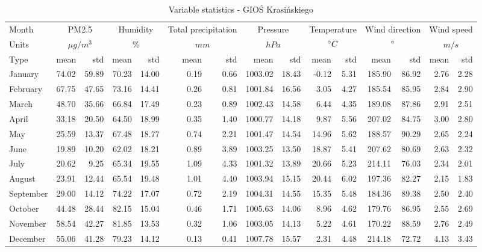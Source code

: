 \begin{landscape}
\begin{table}[H]
\centering
\caption{Variable statistics - GIOŚ Krasińskiego}
\label{tab:dataset-stats-krasinskiego}
\footnotesize
\begin{tabular}{llrrrrrrrrrrrrr}
\hline
Month & \multicolumn{2}{c}{PM2.5} & \multicolumn{2}{c}{Humidity} & \multicolumn{2}{c}{Total precipitation} & \multicolumn{2}{c}{Pressure} & \multicolumn{2}{c}{Temperature} & \multicolumn{2}{c}{Wind direction} & \multicolumn{2}{c}{Wind speed} \\
Units & \multicolumn{2}{c}{$\mu g / m^3$} & \multicolumn{2}{c}{$\%$} & \multicolumn{2}{c}{$mm$} & \multicolumn{2}{c}{$hPa$} & \multicolumn{2}{c}{$\degree C$} & \multicolumn{2}{c}{$\degree$} & \multicolumn{2}{c}{$m/s$} \\
Type & mean & std & mean & std & mean & std & mean & std & mean & std & mean & std & mean & std \\ \hline

January & 74.02 & 59.89 & 70.23 & 14.00 & 0.19 & 0.66 & 1003.02 & 18.43 & -0.12 & 5.31 & 185.90 & 86.92 & 2.76 & 2.28 \\ 
February & 67.75 & 47.65 & 73.16 & 14.41 & 0.26 & 0.81 & 1001.84 & 16.56 & 3.05 & 4.27 & 185.54 & 85.95 & 2.84 & 2.90 \\ 
March & 48.70 & 35.66 & 66.84 & 17.49 & 0.23 & 0.89 & 1002.43 & 14.58 & 6.44 & 4.35 & 189.08 & 87.86 & 2.91 & 2.51 \\ 
April & 33.18 & 20.50 & 64.50 & 18.99 & 0.35 & 1.40 & 1000.77 & 14.18 & 9.87 & 5.56 & 207.02 & 84.75 & 3.00 & 2.80 \\ 
May & 25.59 & 13.37 & 67.48 & 18.77 & 0.74 & 2.21 & 1001.47 & 14.54 & 14.96 & 5.62 & 188.57 & 90.29 & 2.65 & 2.24 \\ 
June & 19.89 & 10.20 & 62.02 & 18.21 & 0.89 & 3.89 & 1003.25 & 13.50 & 18.87 & 5.41 & 207.62 & 80.69 & 2.63 & 2.32 \\ 
July & 20.62 & 9.25 & 65.34 & 19.55 & 1.09 & 4.33 & 1001.32 & 13.89 & 20.66 & 5.23 & 214.11 & 76.03 & 2.34 & 2.01 \\ 
August & 23.91 & 12.44 & 65.54 & 19.48 & 1.01 & 4.40 & 1003.94 & 15.15 & 20.44 & 6.02 & 197.36 & 82.27 & 2.15 & 1.83 \\ 
September & 29.00 & 14.12 & 74.22 & 17.07 & 0.72 & 2.19 & 1004.31 & 14.55 & 15.35 & 5.48 & 184.36 & 89.38 & 2.50 & 2.40 \\ 
October & 44.48 & 28.44 & 82.15 & 15.04 & 0.46 & 1.71 & 1005.63 & 14.06 & 8.96 & 4.62 & 179.76 & 86.95 & 2.55 & 2.69 \\ 
November & 58.54 & 42.27 & 81.85 & 13.53 & 0.32 & 1.06 & 1003.05 & 14.13 & 5.22 & 4.61 & 170.22 & 88.59 & 2.76 & 2.49 \\ 
December & 55.06 & 41.28 & 79.23 & 14.12 & 0.13 & 0.41 & 1007.78 & 15.57 & 2.31 & 4.48 & 214.18 & 72.72 & 4.13 & 3.43 \\ 
\bottomrule

\end{tabular}
\end{table}
\end{landscape}

